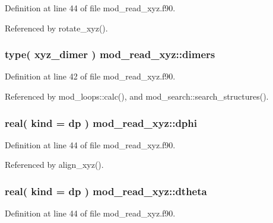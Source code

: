 Definition at line 44 of file mod\+\_\+read\+\_\+xyz.\+f90.



Referenced by rotate\+\_\+xyz().

\subsubsection[{\texorpdfstring{dimers}{dimers}}]{\setlength{\rightskip}{0pt plus 5cm}type( {\bf xyz\+\_\+dimer} ) mod\+\_\+read\+\_\+xyz\+::dimers}\hypertarget{namespacemod__read__xyz_aa013f111078e556f2e4eee9018cd605a}{}\label{namespacemod__read__xyz_aa013f111078e556f2e4eee9018cd605a}


Definition at line 42 of file mod\+\_\+read\+\_\+xyz.\+f90.



Referenced by mod\+\_\+loops\+::calc(), and mod\+\_\+search\+::search\+\_\+structures().

\subsubsection[{\texorpdfstring{dphi}{dphi}}]{\setlength{\rightskip}{0pt plus 5cm}real( kind = dp ) mod\+\_\+read\+\_\+xyz\+::dphi}\hypertarget{namespacemod__read__xyz_a7d29c731d6db9ccacae5b6e2fb25f4c5}{}\label{namespacemod__read__xyz_a7d29c731d6db9ccacae5b6e2fb25f4c5}


Definition at line 44 of file mod\+\_\+read\+\_\+xyz.\+f90.



Referenced by align\+\_\+xyz().

\subsubsection[{\texorpdfstring{dtheta}{dtheta}}]{\setlength{\rightskip}{0pt plus 5cm}real( kind = dp ) mod\+\_\+read\+\_\+xyz\+::dtheta}\hypertarget{namespacemod__read__xyz_a12174845302ad3f92b147b671045e952}{}\label{namespacemod__read__xyz_a12174845302ad3f92b147b671045e952}


Definition at line 44 of file mod\+\_\+read\+\_\+xyz.\+f90.



